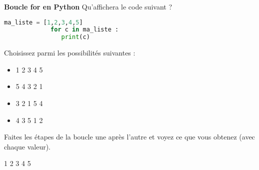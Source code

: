      	
    \begin{Exercice}[5 minutes] \textbf{Boucle for en Python}
      	Qu'affichera le code suivant ?
      	
      	\begin{lstlisting}[language=Python]
             ma_liste = [1,2,3,4,5]
             for c in ma_liste :
             	print(c) 
             	\end{lstlisting}
             	
        Choisissez parmi les possibilités suivantes :
        
        \begin{itemize}
        \item 
        1  
        2 
        3 
        4 
        5 
        \item 
        5 
        4 
        3 
        2 
        1 
        \item 3 
        2 
        1 
        5 
        4 
        \item 4 
        3 
        5 
        1 
        2
        \end{itemize}
    
        \begin{conseil}
		   Faites les étapes de la boucle une après l'autre et voyez ce que vous obtenez (avec chaque valeur).  
        \end{conseil}
        
        \begin{solution}
            1 
            2 
            3 
            4 
            5
        \end{solution}
    \end{Exercice}
    

